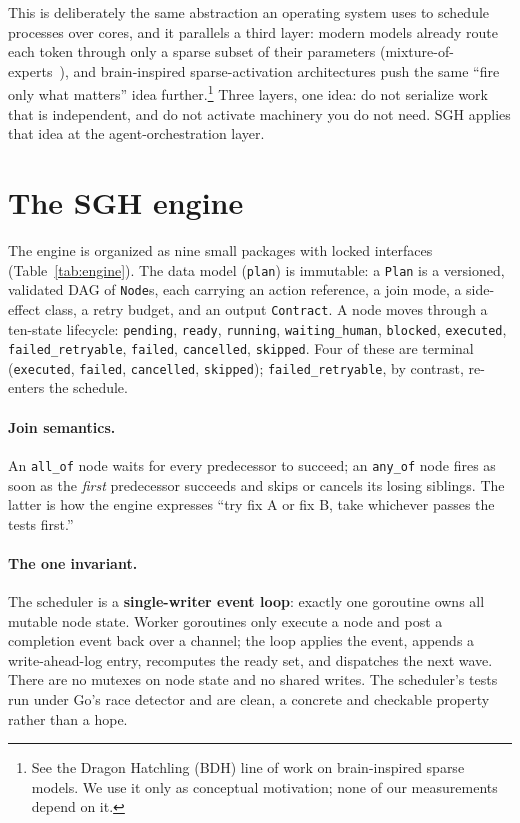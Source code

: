 \documentclass[11pt]{article}
\begin{document}
This is deliberately the same abstraction an operating system uses to schedule processes over
cores, and it parallels a third layer: modern models already route each token through only a
sparse subset of their parameters (mixture-of-experts~\cite{moe}), and brain-inspired
sparse-activation architectures push the same ``fire only what matters'' idea
further.\footnote{See the Dragon Hatchling (BDH) line of work on brain-inspired sparse models. We
use it only as conceptual motivation; none of our measurements depend on it.} Three layers, one
idea: do not serialize work that is independent, and do not activate machinery you do not need.
SGH applies that idea at the agent-orchestration layer.

\section{The SGH engine}
\label{sec:engine}
The engine is organized as nine small packages with locked interfaces
(Table~\ref{tab:engine}). The data model (\texttt{plan}) is immutable: a \texttt{Plan} is a
versioned, validated DAG of \texttt{Node}s, each carrying an action reference, a join mode, a
side-effect class, a retry budget, and an output \texttt{Contract}. A node moves through a
ten-state lifecycle: \texttt{pending}, \texttt{ready}, \texttt{running}, \texttt{waiting\_human},
\texttt{blocked}, \texttt{executed}, \texttt{failed\_retryable}, \texttt{failed},
\texttt{cancelled}, \texttt{skipped}. Four of these are terminal (\texttt{executed},
\texttt{failed}, \texttt{cancelled}, \texttt{skipped}); \texttt{failed\_retryable}, by contrast,
re-enters the schedule.

\paragraph{Join semantics.} An \texttt{all\_of} node waits for every predecessor to succeed; an
\texttt{any\_of} node fires as soon as the \emph{first} predecessor succeeds and skips or cancels
its losing siblings. The latter is how the engine expresses ``try fix A or fix B, take whichever
passes the tests first.''

\paragraph{The one invariant.} The scheduler is a \textbf{single-writer event loop}: exactly one
goroutine owns all mutable node state. Worker goroutines only execute a node and post a completion
event back over a channel; the loop applies the event, appends a write-ahead-log entry, recomputes
the ready set, and dispatches the next wave. There are no mutexes on node state and no shared
writes. The scheduler's tests run under Go's race detector and are clean, a concrete and checkable
property rather than a hope.
\end{document}
